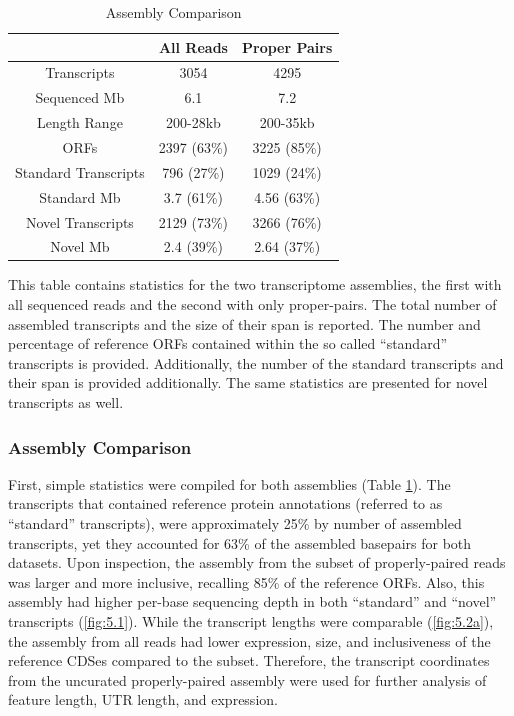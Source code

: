 \begin{table}
\caption{Assembly Comparison}\label{table:assemb_compare}
\begin{center}
\begin{tabular}{|c|c|c|}\hline
  & All Reads & Proper Pairs\\\hline\hline
Transcripts & 3054 & 4295\\\hline
Sequenced Mb & 6.1 & 7.2\\\hline
Length Range & 200-28kb & 200-35kb\\\hline
ORFs & 2397 (63\%) & 3225 (85\%)\\\hline
Standard Transcripts & 796 (27\%) & 1029 (24\%)\\\hline
Standard Mb & 3.7 (61\%) & 4.56 (63\%)\\\hline
Novel Transcripts & 2129 (73\%) & 3266 (76\%)\\\hline
Novel Mb & 2.4 (39\%)& 2.64 (37\%)\\\hline
\end{tabular}
\end{center}
\small
This table contains statistics for the two transcriptome assemblies, the first with all sequenced reads and the second with only proper-pairs. The total number of assembled transcripts and the size of their span is reported. The number and percentage of reference ORFs contained within the so called ``standard'' transcripts is provided. Additionally, the number of the standard transcripts and their span is provided additionally. The same statistics are presented for novel transcripts as well.
\end{table}

\subsubsection{Assembly Comparison}
First, simple statistics were compiled for both assemblies (Table \ref{table:assemb_compare}). The transcripts that contained reference protein annotations (referred to as ``standard'' transcripts), were approximately 25\% by number of assembled transcripts, yet they accounted for 63\% of the assembled basepairs for both datasets. Upon inspection, the assembly from the subset of properly-paired reads was larger and more inclusive, recalling 85\% of the reference ORFs. Also, this assembly had higher per-base sequencing depth in both ``standard'' and ``novel'' transcripts (\ref{fig:5.1}). While the transcript lengths were comparable (\ref{fig:5.2a}), the assembly from all reads had lower expression, size, and inclusiveness of the reference CDSes compared to the subset. Therefore, the transcript coordinates from the uncurated properly-paired assembly were used for further analysis of feature length, UTR length, and expression.




